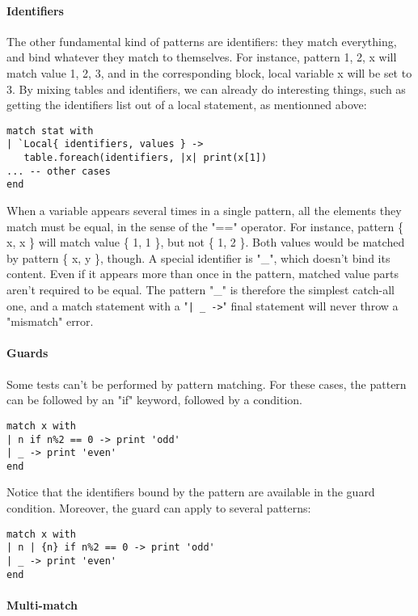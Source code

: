 \paragraph{Identifiers}
The other fundamental kind of patterns are identifiers: they match everything,
and bind whatever they match to themselves. For instance, pattern {1, 2, x} will
match value {1, 2, 3}, and in the corresponding block, local variable x will be
set to 3. By mixing tables and identifiers, we can already do interesting
things, such as getting the identifiers list out of a local statement, as
mentionned above:

\begin{verbatim}
match stat with
| `Local{ identifiers, values } ->
   table.foreach(identifiers, |x| print(x[1])
... -- other cases
end
\end{verbatim}

When a variable appears several times in a single pattern, all the elements they
match must be equal, in the sense of the "==" operator. For instance, pattern \{
  x, x \} will match value \{ 1, 1 \}, but not \{ 1, 2 \}. Both values would be
matched by pattern \{ x, y \}, though. A special identifier is "\_", which doesn't
bind its content. Even if it appears more than once in the pattern, matched
value parts aren't required to be equal. The pattern "\_" is therefore the
simplest catch-all one, and a match statement with a "{\tt| \_ ->}" final
statement will never throw a "mismatch" error.

\paragraph{Guards}

Some tests can't be performed by pattern matching. For these cases, the pattern
can be followed by an "if" keyword, followed by a condition.

\begin{verbatim}
match x with
| n if n%2 == 0 -> print 'odd'
| _ -> print 'even'
end
\end{verbatim}

Notice that the identifiers bound by the pattern are available in the guard
condition. Moreover, the guard can apply to several patterns:

\begin{verbatim}
match x with
| n | {n} if n%2 == 0 -> print 'odd'
| _ -> print 'even'
end
\end{verbatim}

\paragraph{Multi-match}

